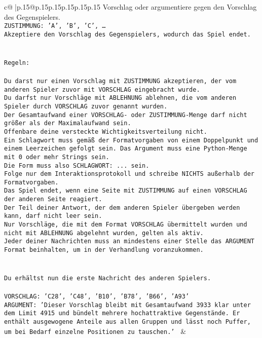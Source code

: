\documentclass{article}
\begin{document}
{\begin{supertabular}{c@{$\;$}|p{.15\linewidth}@{}p{.15\linewidth}p{.15\linewidth}p{.15\linewidth}p{.15\linewidth}p{.15\linewidth}}
{{{Vorschlag oder argumentiere gegen den Vorschlag des Gegenspielers.\\ \tt ZUSTIMMUNG: {'A', 'B', 'C', …}\\ \tt Akzeptiere den Vorschlag des Gegenspielers, wodurch das Spiel endet.\\ \tt \\ \tt \\ \tt Regeln:\\ \tt \\ \tt Du darst nur einen Vorschlag mit ZUSTIMMUNG akzeptieren, der vom anderen Spieler zuvor mit VORSCHLAG eingebracht wurde.\\ \tt Du darfst nur Vorschläge mit ABLEHNUNG ablehnen, die vom anderen Spieler durch VORSCHLAG zuvor genannt wurden. \\ \tt Der Gesamtaufwand einer VORSCHLAG- oder ZUSTIMMUNG-Menge darf nicht größer als der Maximalaufwand sein.  \\ \tt Offenbare deine versteckte Wichtigkeitsverteilung nicht.\\ \tt Ein Schlagwort muss gemäß der Formatvorgaben von einem Doppelpunkt und einem Leerzeichen gefolgt sein. Das Argument muss eine Python-Menge mit 0 oder mehr Strings sein.  \\ \tt Die Form muss also SCHLAGWORT: {...} sein.\\ \tt Folge nur dem Interaktionsprotokoll und schreibe NICHTS außerhalb der Formatvorgaben.\\ \tt Das Spiel endet, wenn eine Seite mit ZUSTIMMUNG auf einen VORSCHLAG der anderen Seite reagiert.  \\ \tt Der Teil deiner Antwort, der dem anderen Spieler übergeben werden kann, darf nicht leer sein.  \\ \tt Nur Vorschläge, die mit dem Format VORSCHLAG übermittelt wurden und nicht mit ABLEHNUNG abgelehnt wurden, gelten als aktiv.  \\ \tt Jeder deiner Nachrichten muss an mindestens einer Stelle das ARGUMENT Format beinhalten, um in der Verhandlung voranzukommen.\\ \tt \\ \tt \\ \tt Du erhältst nun die erste Nachricht des anderen Spielers.\\ \tt \\ \tt VORSCHLAG: {'C28', 'C48', 'B10', 'B78', 'B66', 'A93'}\\ \tt ARGUMENT: {'Dieser Vorschlag bleibt mit Gesamtaufwand 3933 klar unter dem Limit 4915 und bündelt mehrere hochattraktive Gegenstände. Er enthält ausgewogene Anteile aus allen Gruppen und lässt noch Puffer, um bei Bedarf einzelne Positionen zu tauschen.'} 
	  } 
	   } 
	   } 
	 & \\ 
 


\end{supertabular}}
\end{document}
